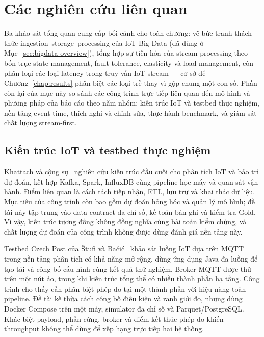 \section{Các nghiên cứu liên quan}
\label{sec:related-work}

Ba khảo sát tổng quan cung cấp bối cảnh cho toàn chương:
\cite{iot_big_data_survey_2022} vẽ bức tranh thách thức
ingestion--storage--processing của IoT Big Data (đã dùng ở
Mục~\ref{sec:bigdata-overview}),
\cite{stream_processing_evolution_2024} tổng hợp sự tiến hóa của stream
processing theo bốn trục state management, fault tolerance, elasticity và
load management, còn \cite{iot_stream_latency_2021} phân loại các loại
latency trong truy vấn IoT stream --- cơ sở để
Chương~\ref{chap:results} phân biệt các loại trễ thay vì gộp chung một con
số. Phần còn lại của mục này so sánh các công trình trực tiếp liên quan đến
mô hình và phương pháp của báo cáo theo năm nhóm: kiến trúc IoT và testbed
thực nghiệm, nền tảng event-time, thích nghi và chỉnh sửa, thực hành
benchmark, và giám sát chất lượng stream-first.

\subsection{Kiến trúc IoT và testbed thực nghiệm}

Khattach và cộng sự~\cite{iot_end_to_end_2025} nghiên cứu kiến trúc đầu cuối
cho phân tích IoT và bảo trì dự đoán, kết hợp Kafka, Spark, InfluxDB cùng
pipeline học máy và quan sát vận hành. Điểm liên quan là cách tách tiếp
nhận, ETL, lưu trữ và khai thác dữ liệu. Mục tiêu của công trình còn bao
gồm dự đoán hỏng hóc và quản lý mô hình; đề tài này tập trung vào data
contract đa chỉ số, kế toán bản ghi và kiểm tra Gold. Vì vậy, kiến trúc
tương đồng không đồng nghĩa cùng bài toán kiểm chứng, và chất lượng dự
đoán của công trình không được dùng đánh giá nền tảng này.

Testbed Czech Post của \v{S}tufi và Ba\v{c}i\'{c}~\cite{iot_testbed_2021} khảo sát luồng
IoT dựa trên MQTT trong nền tảng phân tích có khả năng mở rộng, dùng ứng
dụng Java đa luồng để tạo tải và công bố cấu hình cùng kết quả thử nghiệm.
Broker MQTT được thử trên một nút ảo, trong khi kiến trúc tổng thể có
nhiều thành phần hạ tầng. Công trình cho thấy cần phân biệt phép đo tại
một thành phần với hiệu năng toàn pipeline. Đề tài kế thừa cách công bố
điều kiện và ranh giới đo, nhưng dùng Docker Compose trên một máy,
simulator đa chỉ số và Parquet/PostgreSQL. Khác biệt payload, phần cứng,
broker và điểm kết thúc phép đo khiến throughput không thể dùng để xếp
hạng trực tiếp hai hệ thống.

